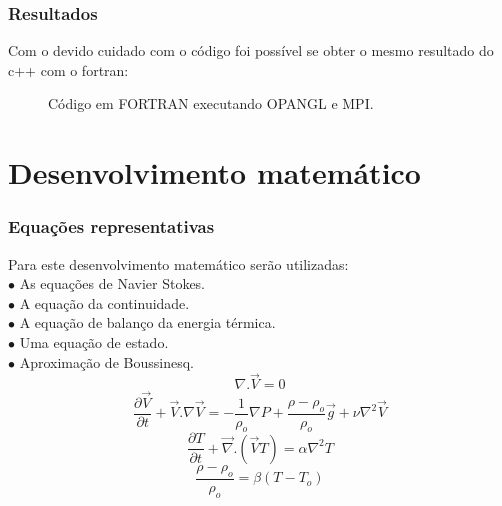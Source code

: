 \documentclass[xcolor=dvipsnames,10pt,aspectratio=169]{beamer}
\begin{document}
	\begin{frame}
		\frametitle{Resultados}

		\begin{minipage}[h!]{0.45\textwidth}
	 		Com o devido cuidado com o código foi possível se obter o mesmo resultado do c++ com o fortran:
	 	\end{minipage}\hfill
 		\begin{minipage}[h!]{0.5\textwidth}
	 		\begin{figure}
	 			\label{gif_gfort}
	 			\caption{Código em FORTRAN executando OPANGL e MPI.}
	 		\end{figure}
	 	\end{minipage}
	\end{frame}




\section{Desenvolvimento matemático}

	\begin{frame}
		\frametitle{Equações representativas}
		\flushleft
		Para este desenvolvimento matemático serão utilizadas:\\
		\quad $\bullet$ As equações de Navier Stokes.\\
		\quad $\bullet$ A equação da continuidade.\\
		\quad $\bullet$ A equação de balanço da energia térmica.\\
		\quad $\bullet$ Uma equação de estado.\\
		\quad $\bullet$ Aproximação de Boussinesq.\\

		\begin{equation}
		\nabla . \vec{V} = 0
		\end{equation}
		\begin{equation}
		\frac{\partial \vec{V}}{\partial t} +  \vec{V} . {\nabla} \vec{V}  =  -\frac{1}{\rho_o} {\nabla}P + \frac{\rho - \rho_o}{\rho_o} \vec{g} + \nu \nabla ^2 \vec{V}
		\end{equation}
		\begin{equation}
		\frac{\partial T}{\partial t} + \vec{\nabla} . \left( \vec{V}T \right) = \alpha \nabla^2T
		\end{equation}
		\begin{equation}
		\frac{\rho - \rho_o}{\rho_o} = \beta \left( T - T_o\right)
		\end{equation}

	\end{frame}
\end{document}
